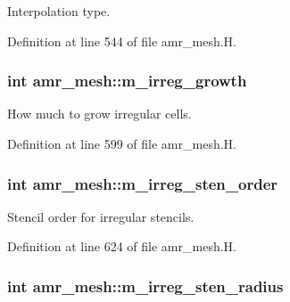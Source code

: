 Interpolation type. 



Definition at line 544 of file amr\+\_\+mesh.\+H.

\subsubsection[{\texorpdfstring{m\+\_\+irreg\+\_\+growth}{m_irreg_growth}}]{\setlength{\rightskip}{0pt plus 5cm}int amr\+\_\+mesh\+::m\+\_\+irreg\+\_\+growth\hspace{0.3cm}{\ttfamily [protected]}}\hypertarget{classamr__mesh_ab79055020b938a495ed2ac142fcc5b11}{}\label{classamr__mesh_ab79055020b938a495ed2ac142fcc5b11}


How much to grow irregular cells. 



Definition at line 599 of file amr\+\_\+mesh.\+H.

\subsubsection[{\texorpdfstring{m\+\_\+irreg\+\_\+sten\+\_\+order}{m_irreg_sten_order}}]{\setlength{\rightskip}{0pt plus 5cm}int amr\+\_\+mesh\+::m\+\_\+irreg\+\_\+sten\+\_\+order\hspace{0.3cm}{\ttfamily [protected]}}\hypertarget{classamr__mesh_acf4cbc6d589dca94abfb5c1d09d87df0}{}\label{classamr__mesh_acf4cbc6d589dca94abfb5c1d09d87df0}


Stencil order for irregular stencils. 



Definition at line 624 of file amr\+\_\+mesh.\+H.

\subsubsection[{\texorpdfstring{m\+\_\+irreg\+\_\+sten\+\_\+radius}{m_irreg_sten_radius}}]{\setlength{\rightskip}{0pt plus 5cm}int amr\+\_\+mesh\+::m\+\_\+irreg\+\_\+sten\+\_\+radius\hspace{0.3cm}{\ttfamily [protected]}}\hypertarget{classamr__mesh_acb284e9758d89887c332bff1ea5bbc0d}{}\label{classamr__mesh_acb284e9758d89887c332bff1ea5bbc0d}


